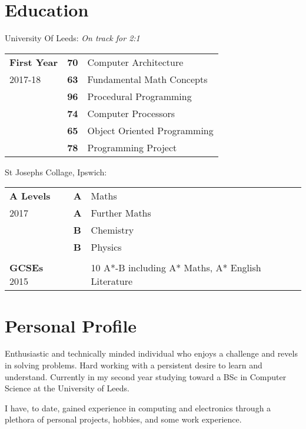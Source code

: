 \documentclass[9pt,a4paper]{article}
\begin{document}
\begin{multicols*}{2}
  \section*{Education}
  \vspace*{-.3cm}
  University Of Leeds:
	\newline \textit{On track for 2:1}
  \vspace*{-6mm}
\begin{center}
  \begin{tabular}{p{2cm} p{0.6cm} p{5.4cm}}
    \textbf{First Year}&\textbf{70}&Computer Architecture\\
	2017-18&\textbf{63}&Fundamental Math Concepts\\
	    &\textbf{96}&Procedural Programming\\
			&\textbf{74}&Computer Processors\\
			&\textbf{65}&Object Oriented Programming\\
			&\textbf{78}&Programming Project
  \end{tabular}
\end{center}
  St Josephs Collage, Ipswich:
  \vspace*{-.6cm}
\begin{center}
  \begin{tabular}{p{2cm} p{0.6cm} p{5.4cm}}
    \textbf{A Levels}&\textbf{A}&Maths\\
	2017&\textbf{A}&Further Maths\\
	    &\textbf{B}&Chemistry\\
	    &\textbf{B}&Physics\\
\\
    \textbf{GCSEs}
        2015&& 10 A*-B including A* Maths, A* English Literature
  \end{tabular}
\end{center}


\section*{Personal Profile}
Enthusiastic and technically minded individual who enjoys a challenge and revels in solving problems.
Hard working with a persistent desire to learn and understand.
Currently in my second year studying toward a BSc in Computer Science at the University of Leeds.

I have, to date, gained experience in computing and electronics through a plethora of personal projects, hobbies, and some work experience.


\end{multicols*}
\end{document}
